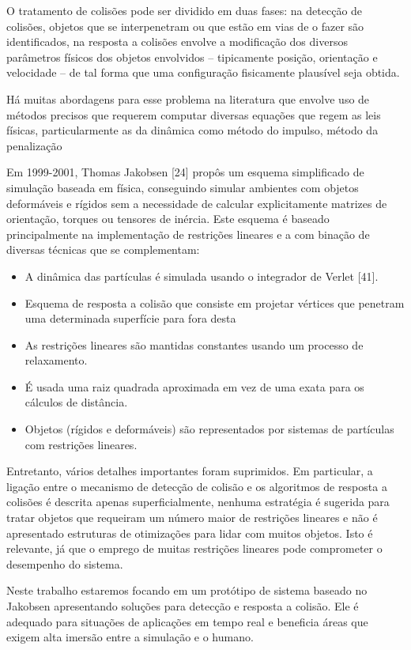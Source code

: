 O tratamento de colisões pode ser dividido em duas fases: na detecção de colisões, objetos que se interpenetram ou que estão em vias de o fazer são identificados, na resposta a colisões envolve a modificação dos diversos parâmetros físicos dos objetos envolvidos – tipicamente posição, orientação e velocidade – de tal forma que uma configuração fisicamente plausível seja obtida. 

Há muitas abordagens para esse problema na literatura que envolve uso de métodos precisos que requerem computar diversas equações que regem as leis físicas, particularmente as da dinâmica como método do impulso, método da penalização %

Em 1999-2001, Thomas Jakobsen [24] propôs um esquema simplificado de simulação baseada em física, conseguindo simular ambientes com objetos deformáveis e rígidos sem a necessidade de calcular explicitamente matrizes de orientação, torques ou tensores de inércia. Este esquema é baseado principalmente na implementação de restrições lineares e a com binação de diversas técnicas que se complementam:

\begin{itemize}
	\item A dinâmica das partículas é simulada usando o integrador de Verlet [41].
	\item Esquema de resposta a colisão que consiste em projetar vértices que penetram uma determinada superfície para fora desta
	\item As restrições lineares são mantidas constantes usando um processo de relaxamento.
	\item É usada uma raiz quadrada aproximada em vez de uma exata para os cálculos de distância.
	\item Objetos (rígidos e deformáveis) são representados por sistemas de partículas com restrições lineares.
\end{itemize}

Entretanto, vários detalhes importantes foram suprimidos. Em particular, a ligação entre o mecanismo de detecção de colisão e os algoritmos de resposta a colisões é descrita apenas superficialmente, nenhuma estratégia é sugerida para tratar objetos que requeiram um número maior de restrições lineares e não é apresentado estruturas de otimizações para lidar com muitos objetos. Isto é relevante, já que o emprego de muitas restrições lineares pode comprometer o desempenho do sistema.

Neste trabalho estaremos focando em um protótipo de sistema baseado no Jakobsen apresentando soluções para detecção e resposta a colisão. Ele é adequado para situações de aplicações em tempo real e beneficia áreas que exigem alta imersão entre a simulação e o humano.

